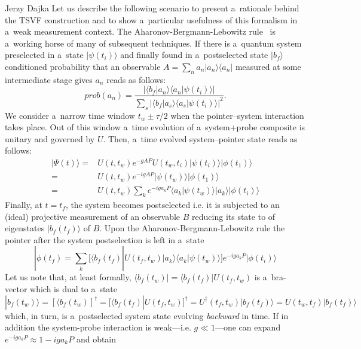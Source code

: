 \begin{artengenv}{Jerzy Dajka}
Let us describe the following scenario to present a~rationale behind the TSVF construction and to show a~particular usefulness of this formalism in a~weak measurement context. 
The Aharonov-Bergmann-Lebowitz rule~\parencite{abl} is a~working horse of many of subsequent techniques. If there is a~quantum system preselected in a~state $|\psi(t_i)\rangle$ and finally found in  a~postselected state $|b_f\rangle$ conditioned probability that an observable $A=\sum_n a_n|a_n\rangle\langle a_n|$ measured at some intermediate stage gives $a_n$ reads as follows:
\begin{equation}\label{abl}
    prob(a_n)=\frac{|\langle b_f|a_n\rangle\langle a_n|\psi(t_i)\rangle|}{\sum_s|\langle b_f|a_s\rangle\langle a_s|\psi(t_i)\rangle|^2}.
\end{equation}
We consider a~narrow time window $t_w\pm\tau/2$ when the pointer--system interaction takes place. Out of this window a~time evolution of a~system+probe composite is unitary and governed by $U$. Then, a~time evolved system--pointer state reads as follows: 
\begin{equation}
\begin{split}
    |\Psi(t)\rangle= &U(t,t_w) e^{-gAP} U(t_w,t_i) |\psi(t_i)\rangle|\phi(t_1)\rangle\\
    =&U(t,t_w) e^{-igAP}|\psi(t_w)\rangle|\phi(t_1)\rangle\\
	=&U(t,t_w)\sum_k e^{-iga_kP}\langle a_k|\psi(t_w)\rangle |a_k\rangle |\phi(t_i)\rangle
\end{split}
\end{equation}
Finally, at $t=t_f$, the system becomes postselected i.e. it is subjected to an (ideal) projective measurement of an observable $B$ reducing its state to of eigenstates $|b_f(t_f)\rangle$ of $B$. Upon the Aharonov-Bergmann-Lebowitz rule the pointer after the system postselection is left in  a~state
\begin{equation}
|\phi(t_f)=\sum_k[\langle b_f(t_f)|U(t_f,t_w)|a_k\rangle\langle a_k|\psi(t_w)\rangle]e^{-iga_kP}|\phi(t_i)\rangle      
\end{equation}
Let us note that, at least formally, $\langle b_f(t_w)|=\langle b_f(t_f)|U(t_f,t_w)$ is a~bra-vector which is dual to a~state  
$|b_f(t_w)\rangle=[\langle b_f(t_w)]^\dagger=[\langle b_f(t_f)|U(t_f,t_w)]^\dagger=U^\dagger(t_f,t_w)|b_f(t_f)\rangle=U(t_w,t_f)|b_f(t_f)\rangle$
which, in turn, is a~postselected system state  
evolving {\it backward} in time.
 If in addition  the system-probe interaction is weak---i.e. $g\ll 1$---one can expand $e^{-iga_kP}\approx 1-iga_k P$ and obtain

\end{artengenv}
